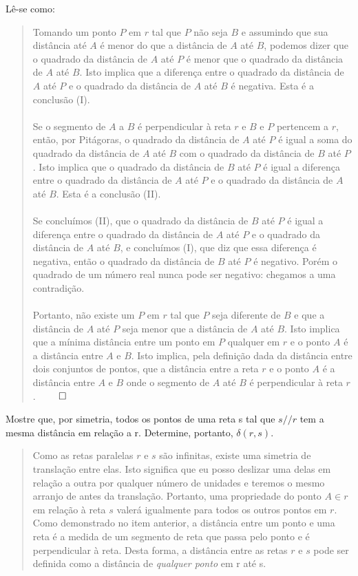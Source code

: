 \documentclass{exam}
\begin{document}
\begin{questions}
\begin{parts}
\begin{subparts}
{        Lê-se como:
        \begin{quote}
          Tomando um ponto $P$ em $r$ tal que $P$ não seja $B$ e assumindo que sua distância até $A$ é menor do que a distância de $A$ até $B$, podemos dizer que o quadrado da distância de $A$ até $P$ é menor que o quadrado da distância de $A$ até $B$. Isto implica que a diferença entre o quadrado da distância de $A$ até $P$ e o quadrado da distância de $A$ até $B$ é negativa. Esta é a conclusão (I). \\
          \\
          Se o segmento de $A$ a $B$ é perpendicular à reta $r$ e $B$ e $P$ pertencem a $r$, então, por Pitágoras, o quadrado da distância de $A$ até $P$ é igual a soma do quadrado da distância de $A$ até $B$ com o quadrado da distância de $B$ até $P$. Isto implica que o quadrado da distância de $B$ até $P$ é igual a diferença entre o quadrado da distância de $A$ até $P$ e o quadrado da distância de $A$ até $B$. Esta é a conclusão (II). \\
          \\
          Se concluímos (II), que o quadrado da distância de $B$ até $P$ é igual a diferença entre o quadrado da distância de $A$ até $P$ e o quadrado da distância de $A$ até $B$, e concluímos (I), que diz que essa diferença é negativa, então o quadrado da distância de $B$ até $P$ é negativo. Porém o quadrado de um número real nunca pode ser negativo: chegamos a uma contradição. \\
          \\
          Portanto, não existe um $P$ em $r$ tal que $P$ seja diferente de $B$ e que a distância de $A$ até $P$ seja menor que a distância de $A$ até $B$. Isto implica que a mínima distância entre um ponto em $P$ qualquer em $r$ e o ponto $A$ é a distância entre $A$ e $B$. Isto implica, pela definição dada da distância entre dois conjuntos de pontos, que a distância entre a reta $r$ e o ponto $A$ é a distância entre $A$ e $B$ onde o segmento de $A$ até $B$ é perpendicular à reta $r$. $\qed$  
        \end{quote}
      }

      \subpart Mostre que, por simetria, todos os pontos de uma reta s tal que $s // r$ tem a mesma distância em relação a r. Determine, portanto, $\delta (r, s)$.
               {\color{red}
                 \begin{quote}
                   Como as retas paralelas $r$ e $s$ são infinitas, existe uma simetria de translação entre elas. Isto significa que eu posso deslizar uma delas em relação a outra por qualquer número de unidades e teremos o mesmo arranjo de antes da translação. Portanto, uma propriedade do ponto $A \in r$ em relação à reta $s$ valerá igualmente para todos os outros pontos em $r$. Como demonstrado no item anterior, a distância entre um ponto e uma reta é a medida de um segmento de reta que passa pelo ponto e é perpendicular à reta. Desta forma, a distância entre as retas $r$ e $s$ pode ser definida como a distância de \emph{qualquer ponto} em r até s.
                 \end{quote}
               }
      

\end{subparts}
\end{parts}
\end{questions}
\end{document}
